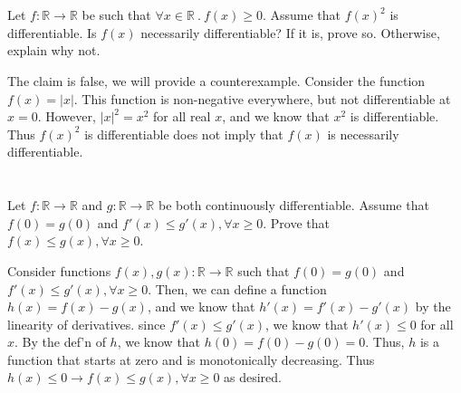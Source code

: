 \documentclass[]{article}
\newcommand{\reals}{\mathbb{R}}
\begin{document}
	\section{}
		\begin{em}
			Let $f:\reals \to \reals$ be such that $\forall x \in \reals\ .\ f(x) \geq 0$. Assume that $f(x)^2$ is differentiable. Is $f(x)$ necessarily differentiable? If it is, prove so. Otherwise, explain why not.
		\end{em}

		The claim is false, we will provide a counterexample. Consider the function $f(x) = |x|$. This function is non-negative everywhere, but not differentiable at $x = 0$. However, $|x|^2 = x^2$ for all real $x$, and we know that $x^2$ is differentiable. Thus $f(x)^2$ is differentiable does not imply that $f(x)$ is necessarily differentiable.

	\section{}
		\begin{em}
			Let $f : \reals \to \reals$ and $g : \reals \to \reals$ be both continuously differentiable. Assume that $f(0) = g(0)$ and $f'(x) \leq g'(x), \forall x \geq 0$. Prove that $f(x) \leq g(x), \forall x \geq 0$.
		\end{em}

		Consider functions $f(x), g(x) : \reals \to \reals$ such that $f(0) = g(0)$ and $f'(x) \leq g'(x), \forall x \geq 0$. Then, we can define a function $h(x) = f(x) - g(x)$, and we know that $h'(x) = f'(x) - g'(x)$ by the linearity of derivatives. since $f'(x) \leq g'(x)$, we know that $h'(x) \leq 0$ for all $x$. By the def'n of $h$, we know that $h(0) = f(0) - g(0) = 0$. Thus, $h$ is a function that starts at zero and is monotonically decreasing. Thus $h(x) \leq 0 \to f(x) \leq g(x), \forall x \geq 0$ as desired. 
\end{document}
